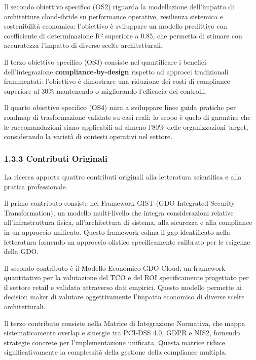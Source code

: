 \documentclass{report}
\begin{document}
Il secondo obiettivo specifico (OS2) riguarda la modellazione
dell'impatto di architetture cloud-ibride su performance operative,
resilienza sistemica e sostenibilità economica: l'obiettivo è sviluppare
un modello predittivo con coefficiente di determinazione R² superiore a
0.85, che permetta di stimare con accuratezza l'impatto di diverse
scelte architetturali.

Il terzo obiettivo specifico (OS3) consiste nel quantificare i benefici
dell'integrazione \textbf{compliance-by-design} rispetto ad approcci
tradizionali frammentati: l'obiettivo è dimostrare una riduzione dei
costi di compliance superiore al 30\% mantenendo o migliorando
l'efficacia dei controlli.

Il quarto obiettivo specifico (OS4) mira a sviluppare linee guida
pratiche per roadmap di trasformazione validate su casi reali: lo scopo
è quelo di garantire che le raccomandazioni siano applicabili ad almeno
l'80\% delle organizzazioni target, considerando la varietà di contesti
operativi nel settore.

\subsubsection{\texorpdfstring{\textbf{1.3.3 Contributi
Originali}}{1.3.3 Contributi Originali}}\label{contributi-originali}

La ricerca apporta quattro contributi originali alla letteratura
scientifica e alla pratica professionale.

Il primo contributo consiste nel Framework GIST (GDO Integrated Security
Transformation), un modello multi-livello che integra considerazioni
relative all'infrastruttura fisica, all'architettura di sistema, alla
sicurezza e alla compliance in un approccio unificato. Questo framework
colma il gap identificato nella letteratura fornendo un approccio
olistico specificamente calibrato per le esigenze della GDO.

Il secondo contributo è il Modello Economico GDO-Cloud, un framework
quantitativo per la valutazione del TCO e del ROI specificamente
progettato per il settore retail e validato attraverso dati empirici.
Questo modello permette ai decision maker di valutare oggettivamente
l'impatto economico di diverse scelte architetturali.

Il terzo contributo consiste nella Matrice di Integrazione Normativa,
che mappa sistematicamente overlap e sinergie tra PCI-DSS 4.0, GDPR e
NIS2, fornendo strategie concrete per l'implementazione unificata.
Questa matrice riduce significativamente la complessità della gestione
della compliance multipla.
\end{document}
